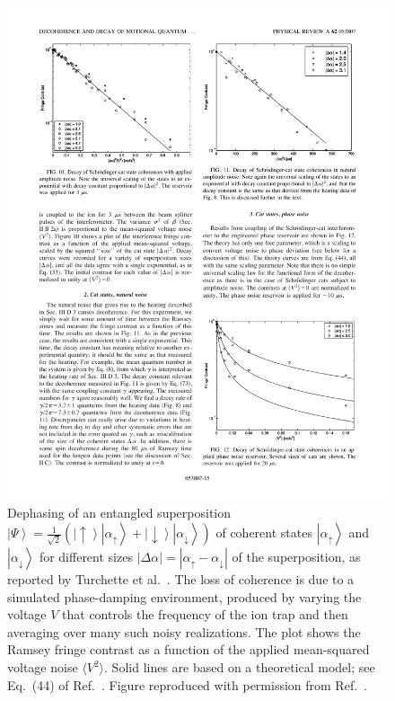 \documentclass[3p,sort&compress]{elsarticle}
\newcommand{\ket}[1]{\left\vert{#1}\right\rangle}
\providecommand{\abs}[1]{\left\lvert#1\right\rvert}
\begin{document}
\begin{figure}
\centering
\includegraphics[scale=0.98]{turch.pdf} 
\caption{Dephasing of an entangled superposition $\ket{\Psi} = \frac{1}{\sqrt{2}} \left( \ket{\uparrow}\ket{\alpha_\uparrow} + \ket{\downarrow} \ket{\alpha_\downarrow} \right)$ of coherent states $\ket{\alpha_\uparrow}$ and $\ket{\alpha_\downarrow}$ for different sizes $\abs{\Delta \alpha} = \abs{\alpha_\uparrow-\alpha_\downarrow}$ of the superposition, as reported by Turchette et al.\ \cite{Turchette:2000:aa}. The loss of coherence is due to a simulated phase-damping environment, produced by varying the voltage $V$ that controls the frequency of the ion trap and then averaging over many such noisy realizations. The plot shows the Ramsey fringe contrast as a function of the applied mean-squared voltage noise $\langle V^2 \rangle$. Solid lines are based on a theoretical model; see Eq.~(44) of Ref.~\cite{Turchette:2000:aa}.  Figure reproduced with permission from Ref.~\cite{Turchette:2000:aa}.}
\label{fig:iondec2}
\end{figure}
 
\end{document}
